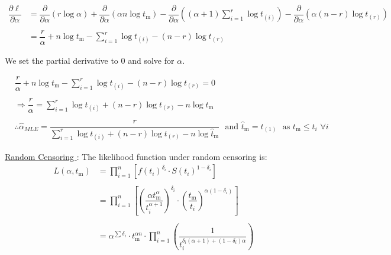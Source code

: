 \documentclass[12pt, a4paper, onecolumn, answers]{exam}
\begin{document}
\begin{questions}
\begin{solution}
\begin{align*}
\dfrac{\partial \ell}{\partial \alpha} 
&= \dfrac{\partial}{\partial \alpha} \left( r \log \alpha \right)
 + \dfrac{\partial}{\partial \alpha} \left( \alpha n \log t_{\mathrm{m}} \right)
 - \dfrac{\partial}{\partial \alpha} \left( (\alpha + 1) \sum_{i=1}^{r} \log t_{(i)} \right)
 - \dfrac{\partial}{\partial \alpha} \left( \alpha(n - r) \log t_{(r)} \right) \\
\\
&= \dfrac{r}{\alpha} + n \log t_{\mathrm{m}} 
   - \sum_{i=1}^{r} \log t_{(i)}
   - (n - r) \log t_{(r)}
\end{align*}

We set the partial derivative to 0 and solve for $\alpha$.

\begin{align*}
&\dfrac{r}{\alpha} + n \log t_{\mathrm{m}} 
   - \sum_{i=1}^{r} \log t_{(i)} 
   - (n - r) \log t_{(r)} = 0 \\
\\
&\Rightarrow \dfrac{r}{\alpha} 
   = \sum_{i=1}^{r} \log t_{(i)} + (n - r) \log t_{(r)} - n \log t_{\mathrm{m}} \\
\\
&\therefore \hat{\alpha}_{MLE}
   = \dfrac{r}{\sum\limits_{i=1}^{r} \log t_{(i)} + (n - r) \log t_{(r)} - n \log \hat{t}_{\mathrm{m}}} \,\,\,\, \text{and } \hat{t}_{\mathrm{m}} = t_{(1)} \,\,\,\, \text{as } t_{\mathrm{m}} \leq t_i \,\, \forall i
\end{align*}

\newpage

\leftpointright \hspace{0.1cm} \underline{Random Censoring } : The likelihood function under random censoring is:
\begin{align*}
L(\alpha, t_{\mathrm{m}}) &= \prod_{i=1}^n \left[ f(t_i)^{\delta_i} \cdot S(t_i)^{1 - \delta_i} \right] \\
\\
&= \prod_{i=1}^n \left[ 
\left( \dfrac{\alpha t_{\mathrm{m}}^\alpha}{t_i^{\alpha + 1}} \right)^{\delta_i}
\cdot 
\left( \dfrac{t_{\mathrm{m}}}{t_i} \right)^{\alpha(1 - \delta_i)}
\right] \\
\\
&= \alpha^{\sum \delta_i} \cdot t_{\mathrm{m}}^{\alpha n} \cdot 
\prod_{i=1}^n \left( \dfrac{1}{t_i^{\delta_i(\alpha + 1) + (1 - \delta_i)\alpha}} \right)\\
\\
\end{align*}


\end{solution}
\end{questions}
\end{document}
